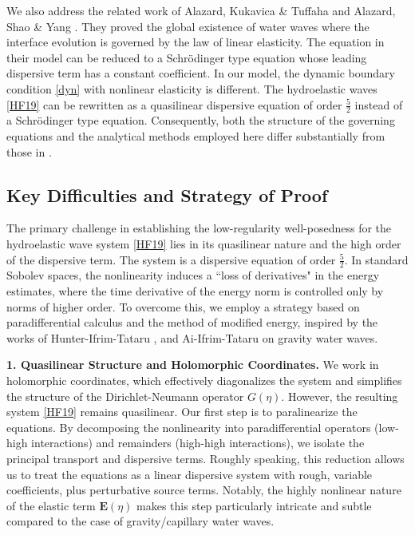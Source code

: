 \documentclass[10pt]{amsart}
\theoremstyle{remark}
\theoremstyle{definition}
\numberwithin{equation}{section}
\newcommand{\f}{\frac}
\begin{document}
We also address the related work of Alazard, Kukavica \& Tuffaha  \cite{MR4905081} and Alazard, Shao \& Yang \cite{ACH}.
They proved the global existence of water waves where the interface evolution is governed by the law of linear elasticity.
The equation in their model can be reduced to a Schr\"odinger type equation whose leading dispersive term has a constant coefficient.
In our model, the dynamic boundary condition \eqref{dyn} with nonlinear elasticity is different.
The hydroelastic waves \eqref{HF19} can be rewritten as a quasilinear dispersive equation of order $\f52$ instead of a Schr\"odinger type equation.
Consequently, both the structure of the governing equations and the analytical methods employed here differ substantially from those in \cite{MR4905081, ACH}.

\subsection{Key Difficulties and Strategy of Proof}
The primary challenge in establishing the low-regularity well-posedness for the hydroelastic wave system \eqref{HF19} lies in its quasilinear nature and the high order of the dispersive term. 
The system is a dispersive equation of order $\f52$. 
In standard Sobolev spaces, the nonlinearity induces a ``loss of derivatives" in the energy estimates, where the time derivative of the energy norm is controlled only by norms of higher order. 
To overcome this, we employ a strategy based on paradifferential calculus and the method of modified energy, inspired by the works of Hunter-Ifrim-Tataru \cite{MR3535894}, and Ai-Ifrim-Tataru \cite{AIT} on gravity water waves.

\textbf{1. Quasilinear Structure and Holomorphic Coordinates.} We work in holomorphic coordinates, which effectively diagonalizes the system and simplifies the structure of the Dirichlet-Neumann operator $G(\eta)$. 
However, the resulting system \eqref{HF19} remains quasilinear. 
Our first step is to paralinearize the equations. 
By decomposing the nonlinearity into paradifferential operators (low-high interactions) and  remainders (high-high interactions), we isolate the principal transport and dispersive terms. 
Roughly speaking, this reduction allows us to treat the equations as a linear dispersive system with rough, variable coefficients, plus perturbative source terms. Notably, the highly nonlinear nature of the elastic term $\mathbf{E}(\eta)$ makes this step particularly intricate and subtle compared to the case of gravity/capillary water waves.
\end{document}
